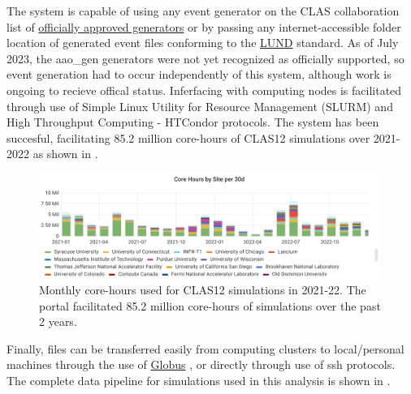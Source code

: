     The system is capable of using any event generator on the CLAS collaboration list of \href{https://github.com/JeffersonLab/clas12-mcgen}{officially approved generators} or by passing any internet-accessible folder location of generated event files conforming to the \href{https://gemc.jlab.org/gemc/html/documentation/generator/lund.html}{LUND} standard. As of July 2023, the aao\_gen generators were not yet recognized as officially supported, so event generation had to occur independently of this system, although work is ongoing to recieve offical status. Inferfacing with computing nodes is facilitated through use of Simple Linux Utility for Resource Management (SLURM) \parencite{Yoo2003SLURM:Management} and High Throughput Computing - HTCondor \parencite{HTCondorTeam2023HTCondor} protocols. The system has been succesful, facilitating 85.2 million core-hours of CLAS12 simulations over 2021-2022 as shown in .
       
    
    \begin{figure}
        \centering
        \includegraphics[width=0.99\textwidth]{Chapters/Ch3-Simulations/overview/pics/core_hours_2021-22.png}
        \caption[Monthly Core-Hours Utilized at Various Computing Clusters]{Monthly core-hours used for CLAS12 simulations in 2021-22. The portal facilitated 85.2 million core-hours of simulations over the past 2 years.}
        \label{fig:monthly_hours}
    \end{figure}

    Finally, files can be transferred easily from computing clusters to local/personal machines through the use of \href{https://www.globus.org/}{Globus} \parencite{Allen2012SoftwareScientists} \parencite{Foster2011GlobusServices}, or directly through use of ssh protocols. The complete data pipeline for simulations used in this analysis is shown in .


